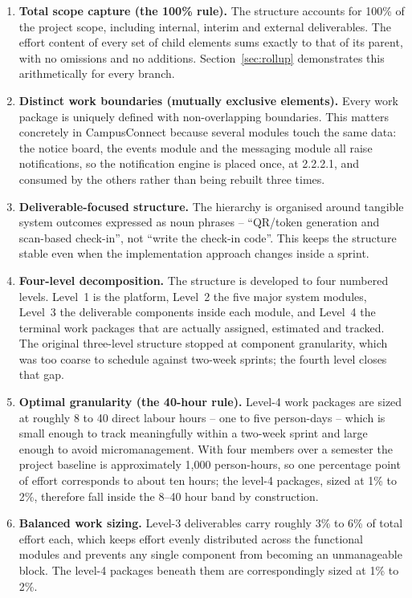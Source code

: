 \documentclass[11pt,a4paper]{report}
\begin{document}
\begin{enumerate}[leftmargin=*,itemsep=7pt]
  \item \textbf{Total scope capture (the 100\% rule).} The structure accounts for
  100\% of the project scope, including internal, interim and external
  deliverables. The effort content of every set of child elements sums exactly to
  that of its parent, with no omissions and no additions. Section~\ref{sec:rollup}
  demonstrates this arithmetically for every branch.

  \item \textbf{Distinct work boundaries (mutually exclusive elements).} Every
  work package is uniquely defined with non-overlapping boundaries. This matters
  concretely in CampusConnect because several modules touch the same data: the
  notice board, the events module and the messaging module all raise
  notifications, so the notification engine is placed once, at 2.2.2.1, and
  consumed by the others rather than being rebuilt three times.

  \item \textbf{Deliverable-focused structure.} The hierarchy is organised around
  tangible system outcomes expressed as noun phrases -- ``QR/token generation and
  scan-based check-in'', not ``write the check-in code''. This keeps the
  structure stable even when the implementation approach changes inside a sprint.

  \item \textbf{Four-level decomposition.} The structure is developed to four
  numbered levels. Level~1 is the platform, Level~2 the five major system
  modules, Level~3 the deliverable components inside each module, and Level~4 the
  terminal work packages that are actually assigned, estimated and tracked. The
  original three-level structure stopped at component granularity, which was too
  coarse to schedule against two-week sprints; the fourth level closes that gap.

  \item \textbf{Optimal granularity (the 40-hour rule).} Level-4 work packages
  are sized at roughly 8 to 40 direct labour hours -- one to five person-days --
  which is small enough to track meaningfully within a two-week sprint and large
  enough to avoid micromanagement. With four members over a semester the project
  baseline is approximately 1{,}000 person-hours, so one percentage point of
  effort corresponds to about ten hours; the level-4 packages, sized at 1\% to
  2\%, therefore fall inside the 8--40 hour band by construction.

  \item \textbf{Balanced work sizing.} Level-3 deliverables carry roughly 3\% to
  6\% of total effort each, which keeps effort evenly distributed across the
  functional modules and prevents any single component from becoming an
  unmanageable block. The level-4 packages beneath them are correspondingly sized
  at 1\% to 2\%.
\end{enumerate}
\end{document}
